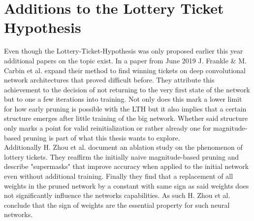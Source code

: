 \section{Additions to the Lottery Ticket Hypothesis}
Even though the Lottery-Ticket-Hypothesis was only proposed earlier this year additional papers on the topic exist.
In a paper from June 2019 J. Frankle \& M. Carbin et al. \cite{LTH-At-Scale} expand their method to find winning tickets on deep convolutional network architectures that proved difficult before. They attribute this achievement to the decision of not returning to the very first state of the network but to one a few iterations into training. Not only does this mark a lower limit for how early pruning is possible with the LTH but it also implies that a certain structure emerges after little training of the big network. Whether said structure only marks a point for valid reinitialization or rather already one for magnitude-based pruning is part of what this thesis wants to explore.\\
Additionally H. Zhou et al. \cite{Deconstructing_LTH} document an ablation study on the phenomenon of lottery tickets. They reaffirm the initially naive magnitude-based pruning and describe "supermasks" that improve accuracy when applied to the initial network even without additional training. Finally they find that a replacement of all weights in the pruned network by a constant with same sign as said weights does not significantly influence the networks capabilities. As such H. Zhou et al. conclude that the sign of weights are the essential property for such neural networks. 
